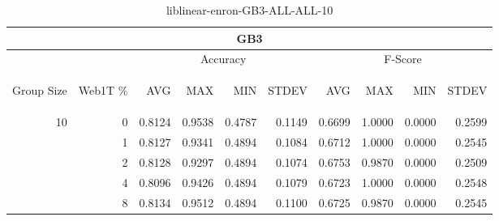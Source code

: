 \begin{center}
\begin{table}[htbp]
\begin{tabular}{ | r | r | r | r | r | r | r | r | r | r |}
\hline
\multicolumn{10}{|c|}{GB3}\\
\hline
 & & \multicolumn{4}{|c|}{Accuracy} & \multicolumn{4}{|c|}{F-Score}\\ \cline{3-10}
\begin{sideways}Group Size\end{sideways} & \begin{sideways}Web1T \%\end{sideways} & \begin{sideways}AVG\end{sideways} & \begin{sideways}MAX\end{sideways} & \begin{sideways}MIN\end{sideways} & \begin{sideways}STDEV\end{sideways} & \begin{sideways}AVG\end{sideways} & \begin{sideways}MAX\end{sideways} & \begin{sideways}MIN\end{sideways} & \begin{sideways}STDEV\end{sideways}\\
\hline
\multirow{4}{*}{10}
 & 0 & 0.8124 & 0.9538 & 0.4787 & 0.1149 & 0.6699 & 1.0000 & 0.0000 & 0.2599\\ \cline{2-10}
 & 1 & 0.8127 & 0.9341 & 0.4894 & 0.1084 & 0.6712 & 1.0000 & 0.0000 & 0.2545\\ \cline{2-10}
 & 2 & 0.8128 & 0.9297 & 0.4894 & 0.1074 & 0.6753 & 0.9870 & 0.0000 & 0.2509\\ \cline{2-10}
 & 4 & 0.8096 & 0.9426 & 0.4894 & 0.1079 & 0.6723 & 1.0000 & 0.0000 & 0.2548\\ \cline{2-10}
 & 8 & 0.8134 & 0.9512 & 0.4894 & 0.1100 & 0.6725 & 0.9870 & 0.0000 & 0.2545\\ \cline{2-10}
\hline
\end{tabular}
\caption{liblinear-enron-GB3-ALL-ALL-10}
\label{table:liblinear-enron-GB3-ALL-ALL-10}
\end{table}
\end{center}

